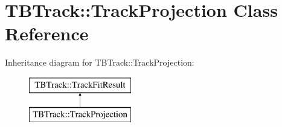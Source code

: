 \section{T\-B\-Track\-:\-:Track\-Projection Class Reference}
\label{classTBTrack_1_1TrackProjection}
Inheritance diagram for T\-B\-Track\-:\-:Track\-Projection\-:\begin{figure}[H]
\begin{center}
\leavevmode
\includegraphics[height=2.000000cm]{classTBTrack_1_1TrackProjection}
\end{center}
\end{figure}
